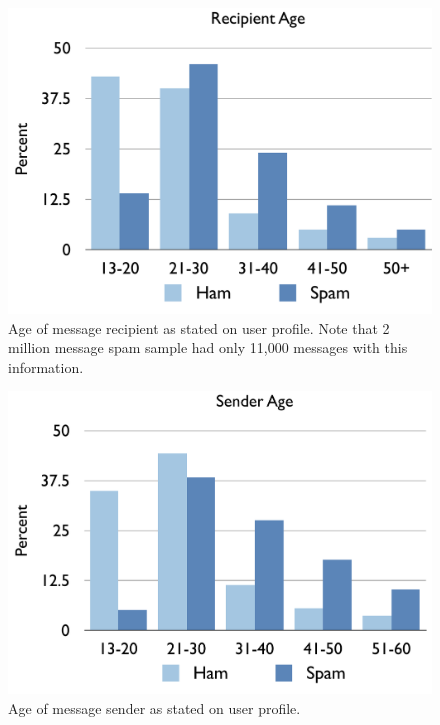 \documentclass[preprint]{acm_proc_article-sp}
\begin{document}
\begin{figure}[h]
    \centering
    \includegraphics[width=\linewidth]{figures/recip-age.pdf}
    \caption{Age of message recipient as stated on user profile. Note that 2 million message spam sample 
        had only 11,000 messages with this information.}
    \label{fig:recipage}
\end{figure}

\begin{figure}[h]
    \centering
    \includegraphics[width=\linewidth]{figures/sender-age.pdf}
    \caption{Age of message sender as stated on user profile. }
    \label{fig:sendage}
\end{figure}
\end{document}
